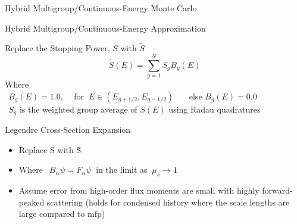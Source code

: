 \documentclass{beamer}
\begin{document}
\begin{frame}{Hybrid Multigroup/Continuous-Energy Monte Carlo}
 
  \begin{block}{ Hybrid Multigroup/Continuous-Energy Approximation}
  
   Replace the Stopping Power, $S$ with $\tilde S$ \\
      $$\tilde{S}(E)=\sum_{g=1}^{N}S_gB_g(E)$$
   Where \\ $~~B_g(E)=1.0$,~~ for $~E \in (E_{g+1/2},E_{g-1/2})$ ~~~else $B_g(E)=0.0$ \\ 
   $~~S_g$ is the weighted group average of $S(E)$ using Radau quadratures

   \end{block}
    
  \begin{block}{Legendre Cross-Section Expansion}
    \begin{itemize}
      \item Replace S with \~S  
      \item Where $~~B_{\alpha}\psi = F_{\alpha}\psi~$ in the limit as $~\mu_s \rightarrow 1$
      \item Assume error from high-order flux moments are small with highly forward-peaked scattering (holds for condensed history where the scale lengths are large compared to mfp)
    \end{itemize}
  \end{block}

\end{frame}
\end{document}
